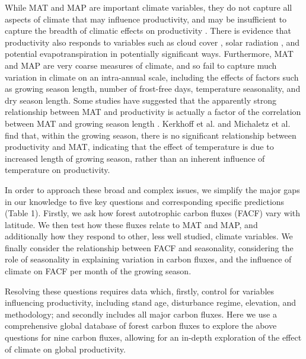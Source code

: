 \documentclass[]{article}
\begin{document}
While MAT and MAP are important climate variables, they do not capture
all aspects of climate that may influence productivity, and may be
insufficient to capture the breadth of climatic effects on productivity
\citep{cleveland_relationships_2011}. There is evidence that
productivity also responds to variables such as cloud cover
\citep{taylor_temperature_2017}, solar radiation
\citep{fyllas_solar_2017}, and potential evapotranspiration
\citep{kerkhoff_plant_2005} in potentially significant ways.
Furthermore, MAT and MAP are very coarse measures of climate, and so
fail to capture much variation in climate on an intra-annual scale,
including the effects of factors such as growing season length, number
of frost-free days, temperature seasonality, and dry season length. Some
studies have suggested that the apparently strong relationship between
MAT and productivity is actually a factor of the correlation between MAT
and growing season length
\citep{kerkhoff_plant_2005, malhi_productivity_2012, michaletz_convergence_2014, michaletz_drivers_2018}.
Kerkhoff et al. \citeyearpar{kerkhoff_plant_2005} and Michaletz et al.
\citeyearpar{michaletz_convergence_2014} find that, within the growing
season, there is no significant relationship between productivity and
MAT, indicating that the effect of temperature is due to increased
length of growing season, rather than an inherent influence of
temperature on productivity.

In order to approach these broad and complex issues, we simplify the
major gaps in our knowledge to five key questions and corresponding
specific predictions (Table 1). Firstly, we ask how forest autotrophic
carbon fluxes (FACF) vary with latitude. We then test how these fluxes
relate to MAT and MAP, and additionally how they respond to other, less
well studied, climate variables. We finally consider the relationship
between FACF and seasonality, considering the role of seasonality in
explaining variation in carbon fluxes, and the influence of climate on
FACF per month of the growing season.

Resolving these questions requires data which, firstly, control for
variables influencing productivity, including stand age, disturbance
regime, elevation, and methodology; and secondly includes all major
carbon fluxes. Here we use a comprehensive global database of forest
carbon fluxes to explore the above questions for nine carbon fluxes,
allowing for an in-depth exploration of the effect of climate on global
productivity.

\renewcommand{\arraystretch}{2}
\end{document}
